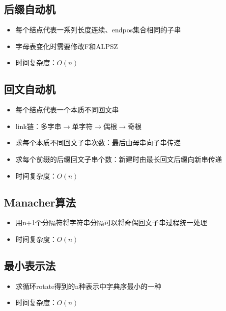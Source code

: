 \documentclass[twocolumn,a4,8pt]{article}  %
\begin{document}
		\subsection{后缀自动机}
	 		\noindent\begin{itemize}
		 		\item 每个结点代表一系列长度连续、endpos集合相同的子串
		 		\item 字母表变化时需要修改F和ALPSZ
		 		\item 时间复杂度：$O(n)$
	 		\end{itemize}
	 	 		
	 	 	
		\subsection{回文自动机}
	 		\noindent\begin{itemize}
		 		\item 每个结点代表一个本质不同回文串
		 		\item link链：多字串$\rightarrow$单字符$\rightarrow$偶根$\rightarrow$奇根
		 		\item 求每个本质不同回文子串次数：最后由母串向子串传递
		 		\item 求每个前缀的后缀回文子串个数：新建时由最长回文后缀向新串传递
		 		\item 时间复杂度：$O(n)$
	 		\end{itemize}
	 	 		
	 	 	
		\subsection{Manacher算法}
	 		\noindent\begin{itemize}
		 		\item 用n+1个分隔符将字符串分隔可以将奇偶回文子串过程统一处理
		 		\item 时间复杂度：$O(n)$
	 		\end{itemize}
	 	 		
	 	 	
		\subsection{最小表示法}
	 		\noindent\begin{itemize}
		 		\item 求循环rotate得到的n种表示中字典序最小的一种
		 		\item 时间复杂度：$O(n)$
	 		\end{itemize}
	 	 		
	 	 	
\end{document}
